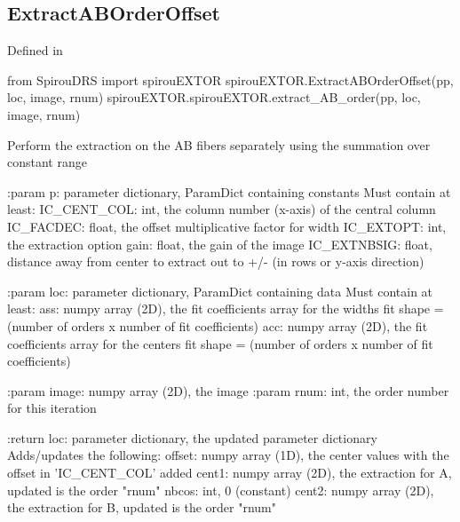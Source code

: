\begin{minipage}{\textwidth}
\subsection{ExtractABOrderOffset}

Defined in \spirouEXTOR{}

\begin{pythonbox}
from SpirouDRS import spirouEXTOR
spirouEXTOR.ExtractABOrderOffset(pp, loc, image, rnum)
spirouEXTOR.spirouEXTOR.extract_AB_order(pp, loc, image, rnum)
\end{pythonbox}

\begin{pythondocstring}
Perform the extraction on the AB fibers separately using the summation
over constant range

:param p: parameter dictionary, ParamDict containing constants
    Must contain at least:
            IC_CENT_COL: int, the column number (x-axis) of the central
                         column
            IC_FACDEC: float, the offset multiplicative factor for width
            IC_EXTOPT: int, the extraction option
            gain: float, the gain of the image
            IC_EXTNBSIG: float, distance away from center to extract
                         out to +/- (in rows or y-axis direction)

:param loc: parameter dictionary, ParamDict containing data
        Must contain at least:
            ass: numpy array (2D), the fit coefficients array for
                  the widths fit
                  shape = (number of orders x number of fit coefficients)
            acc: numpy array (2D), the fit coefficients array for
                  the centers fit
                  shape = (number of orders x number of fit coefficients)


:param image: numpy array (2D), the image
:param rnum: int, the order number for this iteration

:return loc: parameter dictionary, the updated parameter dictionary
        Adds/updates the following:
            offset: numpy array (1D), the center values with the
                    offset in 'IC_CENT_COL' added
            cent1: numpy array (2D), the extraction for A, updated is
                   the order "rnum"
            nbcos: int, 0 (constant)
            cent2: numpy array (2D), the extraction for B, updated is
                   the order "rnum"
\end{pythondocstring}
\end{minipage}

